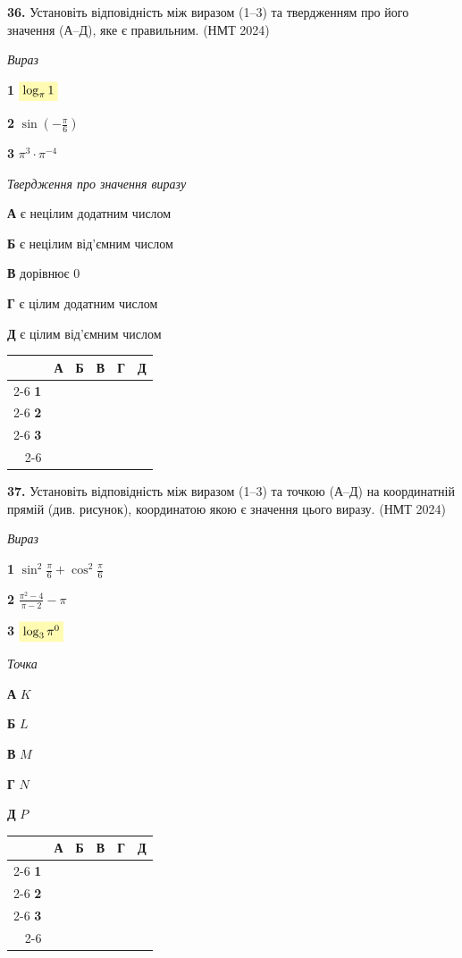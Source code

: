 \documentclass[14pt]{extarticle}
\newcommand{\answerGrid}{
    \begingroup
    \renewcommand{\arraystretch}{1.3} 
    \setlength{\tabcolsep}{7pt} 
    \begin{tabular}{r|c|c|c|c|c|}
         \multicolumn{1}{c}{} & \multicolumn{1}{c}{\textbf{А}} & \multicolumn{1}{c}{\textbf{Б}} & \multicolumn{1}{c}{\textbf{В}} & \multicolumn{1}{c}{\textbf{Г}} & \multicolumn{1}{c}{\textbf{Д}} \\ \cline{2-6}
         \textbf{1} & & & & & \\ \cline{2-6}
         \textbf{2} & & & & & \\ \cline{2-6}
         \textbf{3} & & & & & \\ \cline{2-6}
    \end{tabular}
    \endgroup
}
\newcommand{\matchingLayout}[3]{
    \noindent
    \begin{minipage}[t]{0.40\textwidth}
        #1
    \end{minipage}%
    \hfill
    \begin{minipage}[t]{0.28\textwidth}
        #2
    \end{minipage}%
    \hfill
    \begin{minipage}[t]{0.30\textwidth}
        \vspace{0pt}
        \begin{flushright}
        #3
        \end{flushright}
    \end{minipage}
}
\newcommand{\nmtyear}[1]{\hfill{\small\color{yearcolor}(НМТ #1)}}
\begin{document}
\noindent\textbf{36.} Установіть відповідність між виразом (1--3) та твердженням про його значення (А--Д), яке є правильним. \nmtyear{2024}
\vspace{0.3cm}

\matchingLayout{\textit{Вираз}

\textbf{1} \quad $\colorbox{yellow!30}{$\log_\pi 1$}$

\textbf{2} \quad $\sin \left(-\displaystyle\frac{\pi}{6}\right)$

\textbf{3} \quad $\pi^3 \cdot \pi^{-4}$
}{
\textit{Твердження про значення виразу}

\textbf{А} \quad є нецілим додатним числом

\textbf{Б} \quad є нецілим від'ємним числом

\textbf{В} \quad дорівнює 0

\textbf{Г} \quad є цілим додатним числом

\textbf{Д} \quad є цілим від'ємним числом
}{
\answerGrid
}

\vspace{0.8cm}

\noindent\textbf{37.} Установіть відповідність між виразом (1--3) та точкою (А--Д) на координатній прямій (див. рисунок), координатою якою є значення цього виразу. \nmtyear{2024}
\vspace{0.3cm}

\begin{center}
\end{center}

\vspace{0.3cm}

\matchingLayout{\textit{Вираз}

\textbf{1} \quad $\sin^2 \displaystyle\frac{\pi}{6} + \cos^2 \displaystyle\frac{\pi}{6}$

\textbf{2} \quad $\displaystyle\frac{\pi^2 - 4}{\pi - 2} - \pi$

\textbf{3} \quad $\colorbox{yellow!30}{$\log_3 \pi^0$}$
}{
\textit{Точка}

\textbf{А} \quad $K$

\textbf{Б} \quad $L$

\textbf{В} \quad $M$

\textbf{Г} \quad $N$

\textbf{Д} \quad $P$
}{
\answerGrid
}
\end{document}
